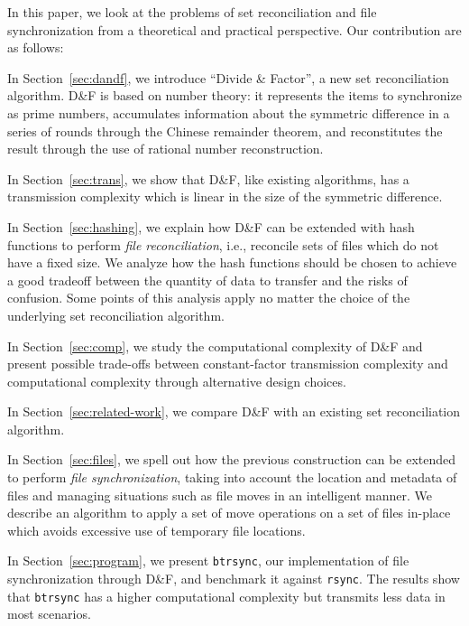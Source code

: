 \documentclass[twoside,envcountsame,runningheads]{llncs}
\newcommand{\df}{D\&F\xspace}
\newcommand{\btrsync}{\texttt{btrsync}\xspace}
\newcommand{\rsync}{\texttt{rsync}\xspace}
\begin{document}
In this paper, we look at the problems of set reconciliation and file
synchronization from a theoretical and practical perspective. Our contribution
are as follows:
\begin{compactitem}
  \item In Section~\ref{sec:dandf}, we introduce ``Divide \& Factor'', a new set
    reconciliation algorithm. \df is based on number theory: it represents the
    items to synchronize as prime numbers, accumulates information about the
    symmetric difference in a series of rounds through the Chinese remainder
    theorem, and reconstitutes the result through the use of rational number
    reconstruction.
  \item In Section~\ref{sec:trans}, we show that \df, like existing algorithms,
    has a transmission complexity which is linear in the size of the symmetric
    difference.%
  \item In Section~\ref{sec:hashing}, we explain how \df can be extended with
    hash functions to perform \emph{file reconciliation}, i.e., reconcile sets
    of files which do not have a fixed size. We analyze how the hash functions
    should be chosen to achieve a good tradeoff between the quantity of data to
    transfer and the risks of confusion. Some points of this analysis apply no
    matter the choice of the underlying set reconciliation algorithm.
  \item In Section~\ref{sec:comp}, we study the computational complexity of \df
    and present possible trade-offs between constant-factor transmission
    complexity and computational complexity through alternative design choices.
  \item In Section~\ref{sec:related-work}, we compare \df with an existing set
    reconciliation algorithm.
  \item In Section~\ref{sec:files}, we spell out how the previous construction
    can be extended to perform \emph{file synchronization}, taking into account
    the location and metadata of files and managing situations such as file
    moves in an intelligent manner. We describe an algorithm to apply a set of
    move operations on a set of files in-place which avoids excessive use of
    temporary file locations.
  \item In Section~\ref{sec:program}, we present \btrsync, our implementation
    of file synchronization through \df, and benchmark it against \rsync. The
    results show that \btrsync has a higher computational complexity but
    transmits less data in most scenarios.
\end{compactitem}
\end{document}

